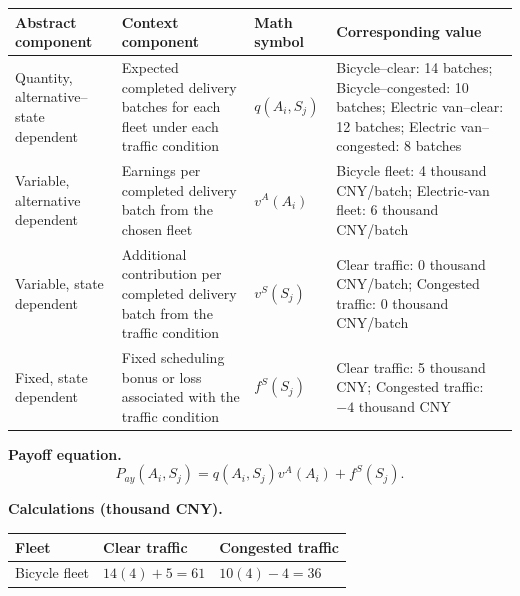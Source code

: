 {			\begin{center}
				\small
				\begin{tabularx}{\textwidth}{
						>{\raggedright\arraybackslash}X
						>{\raggedright\arraybackslash}X
						>{\centering\arraybackslash}p{}
						>{\raggedright\arraybackslash}X
					}
					\toprule
					Abstract component & Context component & Math symbol & Corresponding value \\
					\midrule
					Quantity, alternative--state dependent
					&
					Expected completed delivery batches for each fleet under each traffic condition
					&
					$q(A_i,S_j)$
					&
					Bicycle--clear: 14 batches; Bicycle--congested: 10 batches; Electric van--clear: 12 batches; Electric van--congested: 8 batches
					\\
					
					Variable, alternative dependent
					&
					Earnings per completed delivery batch from the chosen fleet
					&
					$v^A(A_i)$
					&
					Bicycle fleet: 4 thousand CNY/batch; Electric-van fleet: 6 thousand CNY/batch
					\\
					
					Variable, state dependent
					&
					Additional contribution per completed delivery batch from the traffic condition
					&
					$v^S(S_j)$
					&
					Clear traffic: 0 thousand CNY/batch; Congested traffic: 0 thousand CNY/batch
					\\
					
					Fixed, state dependent
					&
					Fixed scheduling bonus or loss associated with the traffic condition
					&
					$f^S(S_j)$
					&
					Clear traffic: 5 thousand CNY; Congested traffic: $-4$ thousand CNY
					\\
					\bottomrule
				\end{tabularx}
			\end{center}
			
			\textbf{Payoff equation.}
			\[
			P_{ay}(A_i,S_j)
			=
			q(A_i,S_j)v^A(A_i)
			+
			f^S(S_j).
			\]
			
			\textbf{Calculations (thousand CNY).}
			
			\begin{center}
				\begin{tabularx}{\textwidth}{
						>{\raggedright\arraybackslash}X
						>{\centering\arraybackslash}X
						>{\centering\arraybackslash}X
					}
					\toprule
					Fleet & Clear traffic & Congested traffic \\
					\midrule
					Bicycle fleet
					&
					$14(4)+5=61$
					&
					$10(4)-4=36$
					\\
					

\end{tabularx}
\end{center}}
